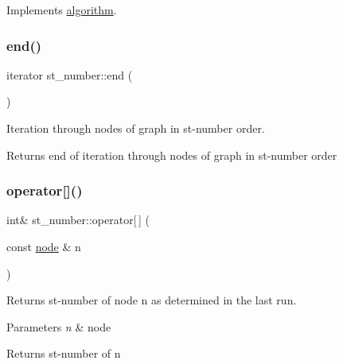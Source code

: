 Implements \mbox{\hyperlink{classalgorithm_a76361fb03ad1cf643affc51821e43bed}{algorithm}}.

\mbox{\label{classst__number_a3912b83a8cbddcb1fc804d20be528d52}} 
\subsubsection{\texorpdfstring{end()}{end()}}
{\footnotesize\ttfamily iterator st\+\_\+number\+::end (\begin{DoxyParamCaption}{ }\end{DoxyParamCaption})\hspace{0.3cm}{\ttfamily [inline]}}



Iteration through nodes of graph in st-\/number order. 

\begin{DoxyReturn}{Returns}
end of iteration through nodes of graph in st-\/number order 
\end{DoxyReturn}
\mbox{\label{classst__number_a969162a10da5daba4219419d45c4be51}} 
\subsubsection{\texorpdfstring{operator[]()}{operator[]()}}
{\footnotesize\ttfamily int\& st\+\_\+number\+::operator\mbox{[}$\,$\mbox{]} (\begin{DoxyParamCaption}\item[{const \mbox{\hyperlink{classnode}{node}} \&}]{n }\end{DoxyParamCaption})\hspace{0.3cm}{\ttfamily [inline]}}



Returns st-\/number of node {\ttfamily n} as determined in the last run. 


\begin{DoxyParams}{Parameters}
{\em n} & node\\
\hline
\end{DoxyParams}
\begin{DoxyReturn}{Returns}
st-\/number of {\ttfamily n} 
\end{DoxyReturn}
\mbox{\label{classst__number_a56f2c67e9b49362947fe0c99278f6d31}} 
